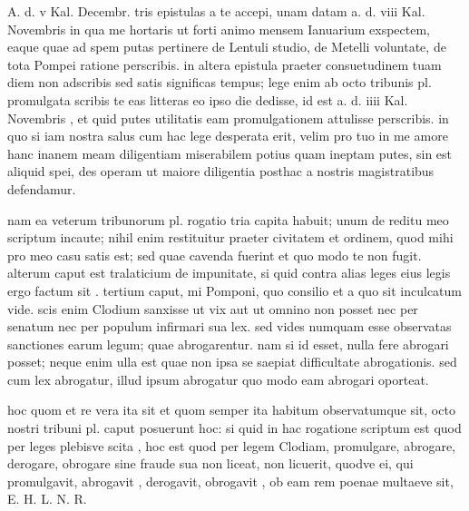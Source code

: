 


 A. d. v Kal. Decembr. tris epistulas a te accepi, unam datam a. d. viii Kal. Novembris in qua me hortaris ut forti animo mensem Ianuarium exspectem, eaque quae ad spem putas pertinere de Lentuli studio, de Metelli voluntate, de tota Pompei ratione perscribis. in altera epistula praeter consuetudinem tuam diem non adscribis sed satis significas tempus; lege enim ab octo tribunis pl. promulgata scribis te eas litteras eo ipso die dedisse, id est a. d. iiii Kal. Novembris , et quid putes utilitatis eam promulgationem attulisse perscribis. in quo si iam nostra salus cum hac lege desperata erit, velim pro tuo in me amore hanc inanem meam diligentiam miserabilem potius quam ineptam putes, sin est aliquid spei, des operam ut maiore diligentia posthac a nostris magistratibus defendamur.

 nam ea veterum tribunorum pl. rogatio tria capita habuit; unum de reditu meo scriptum incaute; nihil enim restituitur praeter civitatem et ordinem, quod mihi pro meo casu satis est; sed quae cavenda fuerint et quo modo te non fugit. alterum caput est tralaticium de impunitate, si quid contra alias leges eius legis ergo factum sit . tertium caput, mi Pomponi, quo consilio et a quo sit inculcatum vide. scis enim Clodium sanxisse ut vix aut ut omnino non posset nec per senatum nec per populum infirmari sua lex. sed vides numquam esse observatas sanctiones earum legum; quae abrogarentur. nam si id esset, nulla fere abrogari posset; neque enim ulla est quae non ipsa se saepiat difficultate abrogationis. sed cum lex abrogatur, illud ipsum abrogatur quo modo eam abrogari oporteat.

 hoc quom et re vera ita sit et quom semper ita habitum observatumque sit, octo nostri tribuni pl. caput posuerunt hoc: si quid in hac rogatione scriptum est quod per leges plebisve scita , hoc est quod per legem Clodiam, promulgare, abrogare, derogare, obrogare sine fraude sua non liceat, non licuerit, quodve ei, qui promulgavit, abrogavit , derogavit, obrogavit , ob eam rem poenae multaeve sit, E. H. L. N. R.

